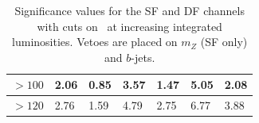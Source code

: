 \begin{table}[H]
\begin{tabular}{|l|llllll}
$>100$   & \multicolumn{1}{l|}{2.06}               & \multicolumn{1}{l|}{0.85}               & \multicolumn{1}{l|}{3.57}               & \multicolumn{1}{l|}{1.47}               & \multicolumn{1}{l|}{5.05}               & \multicolumn{1}{l|}{2.08}               \\ \hline
$>120$    & \multicolumn{1}{l|}{2.76}               & \multicolumn{1}{l|}{1.59}               & \multicolumn{1}{l|}{4.79}               & \multicolumn{1}{l|}{2.75}               & \multicolumn{1}{l|}{6.77}               & \multicolumn{1}{l|}{3.88}               \\ \hline
\end{tabular}
\caption{Significance values for the SF and DF channels with cuts on \mttwo \, at increasing integrated luminosities. Vetoes are placed on $m_Z$ (SF only) and $b$-jets. }
\label{tab:SF_score_0bjets}
\end{table}


